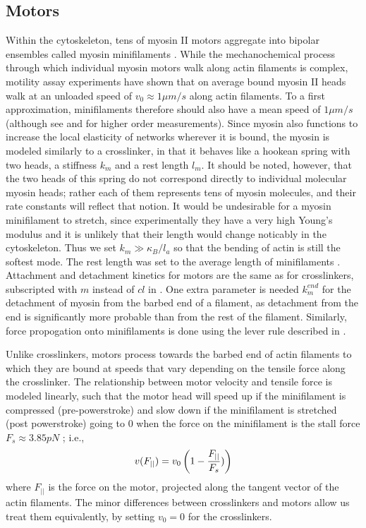 \documentclass[12pt]{article} \usepackage{times} \usepackage{graphicx}
\begin{document}
\subsection{Motors}\label{sec:methods_motors} Within the cytoskeleton, tens of
myosin II motors aggregate into bipolar ensembles called myosin minifilaments
\cite{stam2015}. While the mechanochemical process through which individual
myosin motors walk along actin filaments is complex, motility assay experiments
have shown that on average bound myosin II heads walk at an unloaded speed of
$v_0\approx1\mu m/s$ along actin filaments\cite{finer1994}. To a first
approximation, minifilaments therefore should also have a mean speed of $1\mu
m/s$ (although see \cite{stam2015} and \cite{walcott2012} for higher order
measurements).  Since myosin also functions to increase the local elasticity of
networks wherever it is bound, the myosin is modeled similarly to a
crosslinker, in that it behaves like a hookean spring with two heads, a
stiffness $k_{m}$ and a rest length $l_m$. It should be noted, however, that
the two heads of this spring do not correspond directly to individual molecular
myosin heads; rather each of them represents tens of myosin molecules, and
their rate constants will reflect that notion.  It would be undesirable for a
myosin minifilament to stretch, since experimentally they have a very high
Young's modulus and it is unlikely that their length would change noticably in
the cytoskeleton. Thus we set $k_m\gg\kappa_B/l_a$ so that the bending of actin
is still the softest mode.  The rest length was set to the average length of
minifilaments \cite{niederman1975}.  Attachment and detachment kinetics for
motors are the same as for crosslinkers, subscripted with $m$ instead of $cl$
in . One extra parameter is needed $k_m^{end}$ for
the detachment of myosin from the barbed end of a filament, as detachment from
the end is significantly more probable than from the rest of the filament.
Similarly, force propogation onto minifilaments is done using the lever rule
described in .  \par Unlike crosslinkers, motors process
towards the barbed end of actin filaments to which they are bound at speeds
that vary depending on the tensile force along the crosslinker.  The
relationship between motor velocity and tensile force is modeled linearly, such
that the motor head will speed up if the minifilament is compressed
(pre-powerstroke) and slow down if the minifilament is stretched (post
powerstroke) going to $0$ when the force on the minifilament is the stall force
$F_s\approx 3.85pN$ \cite{nedelec2002, gordon2012}; i.e.,  \begin{equation}
  v(F_{||}) = v_0\left( 1-{F_{||}\over F_s}) \right) \label{eqn:myo_vel}
\end{equation} where $F_{||}$ is the force on the motor, projected along the
tangent vector of the actin filaments.  The minor differences between
crosslinkers and motors allow us treat them equivalently, by setting $v_0 = 0$
for the crosslinkers.  
\end{document}
